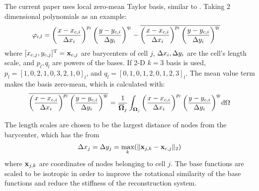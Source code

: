 The current paper uses local zero-mean Taylor basis, similar to
\cite{wang2017compact_VR}.
Taking 2 dimensional polynomials as an example:
\begin{equation}
    \begin{aligned}
        \varphi_{i,l} & =
        \left(\frac{x - x_{c,i}}{\mathrm\Delta x_i}\right)^{p_l}
        \left(\frac{y - y_{c,i}}{\mathrm\Delta y_i}\right)^{q_l}
        -
        \overline{
            \left(\frac{x - x_{c,i}}{\mathrm\Delta x_i}\right)^{p_l}
            \left(\frac{y - y_{c,i}}{\mathrm\Delta y_i}\right)^{q_l}
        }
    \end{aligned}
\end{equation}
where $[x_{c,j},y_{c,j}]^\mathrm{T} = \mathbf{x}_{c,j}$ are barycenters of cell $j$,
$\mathrm\Delta x_i,\mathrm\Delta y_i$ are the cell's length scale, and $p_l,q_l$ are
powers of the bases. If 2-D $k=3$ basis is used, $p_l=[1,0,2,1,0,3,2,1,0]_l$,
and $q_l=[0,1,0,1,2,0,1,2,3]_l$.
The mean value term makes the basis zero-mean, which is calculated with:
\begin{equation}
    \overline{
        \left(\frac{x - x_{c,i}}{\mathrm\Delta x_i}\right)^{p_l}
        \left(\frac{y - y_{c,i}}{\mathrm\Delta y_i}\right)^{q_l}
    }
    =
    \frac{1}{\overline{\mathbf{\Omega}}_j}\int_{\mathbf{\Omega}_j}{
        \left(\frac{x - x_{c,i}}{\mathrm\Delta x_i}\right)^{p_l}
        \left(\frac{y - y_{c,i}}{\mathrm\Delta y_i}\right)^{q_l}
    }\dd \Omega
\end{equation}

The length scales are chosen to be the largest distance of nodes from the
barycenter, which has the from
\begin{equation}
    \mathrm\Delta x_j = \mathrm\Delta y_j = \max_k(\|\mathbf{x}_{j,k} - \mathbf{x}_{c,j}\|_2)
\end{equation}
where $\mathbf{x}_{j,k}$ are coordinates of nodes belonging to cell $j$.
The base functions are scaled to be isotropic in order
to improve the rotational similarity of the base functions
and reduce the stiffness of the reconstruction system.

